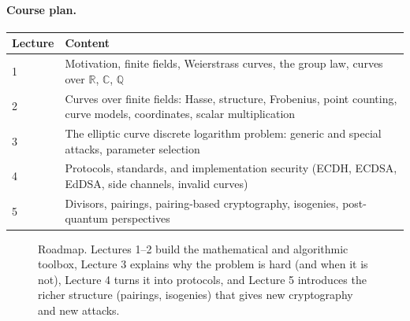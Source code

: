 \documentclass[11pt,a4paper,oneside]{book}
\theoremstyle{plain}
\theoremstyle{definition}
\theoremstyle{remark}
\newcommand{\Q}{\mathbb{Q}}
\newcommand{\R}{\mathbb{R}}
\newcommand{\C}{\mathbb{C}}
\begin{document}
\paragraph{Course plan.}
\begin{center}
\small
\begin{tabular}{@{}p{1.6cm}p{11cm}@{}}
\toprule
\textbf{Lecture} & \textbf{Content}\\
\midrule
1 & Motivation, finite fields, Weierstrass curves, the group law, curves over $\R$, $\C$, $\Q$\\
2 & Curves over finite fields: Hasse, structure, Frobenius, point counting, curve models, coordinates, scalar multiplication\\
3 & The elliptic curve discrete logarithm problem: generic and special attacks, parameter selection\\
4 & Protocols, standards, and implementation security (ECDH, ECDSA, EdDSA, side channels, invalid curves)\\
5 & Divisors, pairings, pairing-based cryptography, isogenies, post-quantum perspectives\\
\bottomrule
\end{tabular}
\end{center}

\begin{figure}[ht]
\centering
{}
\caption{Roadmap. Lectures 1--2 build the mathematical and algorithmic toolbox, Lecture 3 explains why the problem is hard (and when it is not), Lecture 4 turns it into protocols, and Lecture 5 introduces the richer structure (pairings, isogenies) that gives new cryptography and new attacks.}
\end{figure}
\end{document}

